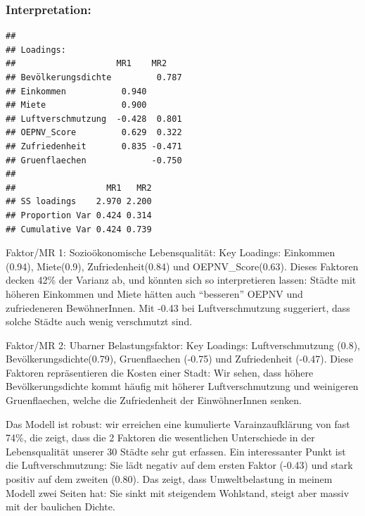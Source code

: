 \documentclass[
]{article}
\newenvironment{Shaded}{\begin{snugshade}}{\end{snugshade}}
\newcommand{\AttributeTok}[1]{\textcolor[rgb]{0.13,0.29,0.53}{#1}}
\newcommand{\FloatTok}[1]{\textcolor[rgb]{0.00,0.00,0.81}{#1}}
\newcommand{\FunctionTok}[1]{\textcolor[rgb]{0.13,0.29,0.53}{\textbf{#1}}}
\newcommand{\NormalTok}[1]{#1}
\newcommand{\SpecialCharTok}[1]{\textcolor[rgb]{0.81,0.36,0.00}{\textbf{#1}}}
\begin{document}
\subsubsection{Interpretation:}\label{interpretation}

\begin{Shaded}
\end{Shaded}

\begin{verbatim}
## 
## Loadings:
##                    MR1    MR2   
## Bevölkerungsdichte         0.787
## Einkommen           0.940       
## Miete               0.900       
## Luftverschmutzung  -0.428  0.801
## OEPNV_Score         0.629  0.322
## Zufriedenheit       0.835 -0.471
## Gruenflaechen             -0.750
## 
##                  MR1   MR2
## SS loadings    2.970 2.200
## Proportion Var 0.424 0.314
## Cumulative Var 0.424 0.739
\end{verbatim}

Faktor/MR 1: Sozioökonomische Lebensqualität: Key Loadings: Einkommen
(0.94), Miete(0.9), Zufriedenheit(0.84) und OEPNV\_Score(0.63). Dieses
Faktoren decken 42\% der Varianz ab, und könnten sich so interpretieren
lassen: Städte mit höheren Einkommen und Miete hätten auch ``besseren''
OEPNV und zufriedeneren BewöhnerInnen. Mit -0.43 bei Luftverschmutzung
suggeriert, dass solche Städte auch wenig verschmutzt sind.

Faktor/MR 2: Ubarner Belastungsfaktor: Key Loadings: Luftverschmutzung
(0.8), Bevölkerungsdichte(0.79), Gruenflaechen (-0.75) und Zufriedenheit
(-0.47). Diese Faktoren repräsentieren die Kosten einer Stadt: Wir
sehen, dass höhere Bevölkerungsdichte kommt häufig mit höherer
Luftverschmutzung und weinigeren Gruenflaechen, welche die Zufriedenheit
der EinwöhnerInnen senken.

Das Modell ist robust: wir erreichen eine kumulierte Varainzaufklärung
von fast 74\%, die zeigt, dass die 2 Faktoren die wesentlichen
Unterschiede in der Lebensqualität unserer 30 Städte sehr gut erfassen.
Ein interessanter Punkt ist die Luftverschmutzung: Sie lädt negativ auf
dem ersten Faktor (-0.43) und stark positiv auf dem zweiten (0.80). Das
zeigt, dass Umweltbelastung in meinem Modell zwei Seiten hat: Sie sinkt
mit steigendem Wohlstand, steigt aber massiv mit der baulichen Dichte.
\end{document}
